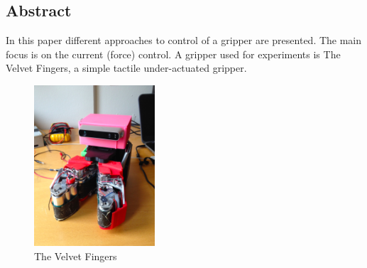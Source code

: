 \clearpage
\thispagestyle{empty}
\vspace*{\fill}
\begin{center} 
  \section*{Abstract} 
\end{center}
In this paper different approaches to control of a gripper are presented. The main focus is on the current (force) control. A gripper used for experiments is \textsf{The Velvet Fingers}, a simple tactile under-actuated gripper.

\begin{figure}[H]
 \begin{center} 
  \includegraphics[width=0.4\textwidth]{stuff/my_vfg}
 \end{center}
 \caption{The Velvet Fingers}
 \label{fig:carol_in_house} 
\end{figure}   
\vspace*{\fill}